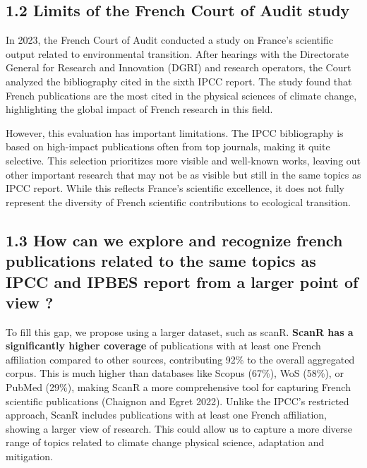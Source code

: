 \documentclass[
]{article}
\begin{document}
\hypertarget{limits-of-the-french-court-of-audit-study}{%
\subsection{1.2 Limits of the French Court of Audit
study}\label{limits-of-the-french-court-of-audit-study}}

In 2023, the French Court of Audit conducted a study on France's
scientific output related to environmental transition. After hearings
with the Directorate General for Research and Innovation (DGRI) and
research operators, the Court analyzed the bibliography cited in the
sixth IPCC report. The study found that French publications are the most
cited in the physical sciences of climate change, highlighting the
global impact of French research in this field.

However, this evaluation has important limitations. The IPCC
bibliography is based on high-impact publications often from top
journals, making it quite selective. This selection prioritizes more
visible and well-known works, leaving out other important research that
may not be as visible but still in the same topics as IPCC report. While
this reflects France's scientific excellence, it does not fully
represent the diversity of French scientific contributions to ecological
transition.

\hypertarget{how-can-we-explore-and-recognize-french-publications-related-to-the-same-topics-as-ipcc-and-ipbes-report-from-a-larger-point-of-view}{%
\subsection{1.3 How can we explore and recognize french publications
related to the same topics as IPCC and IPBES report from a larger point
of view
?}\label{how-can-we-explore-and-recognize-french-publications-related-to-the-same-topics-as-ipcc-and-ipbes-report-from-a-larger-point-of-view}}

To fill this gap, we propose using a larger dataset, such as scanR.
\textbf{ScanR has a significantly higher coverage} of publications with
at least one French affiliation compared to other sources, contributing
92\% to the overall aggregated corpus. This is much higher than
databases like Scopus (67\%), WoS (58\%), or PubMed (29\%), making ScanR
a more comprehensive tool for capturing French scientific publications
(Chaignon and Egret 2022). Unlike the IPCC's restricted approach, ScanR
includes publications with at least one French affiliation, showing a
larger view of research. This could allow us to capture a more diverse
range of topics related to climate change physical science, adaptation
and mitigation.
\end{document}
